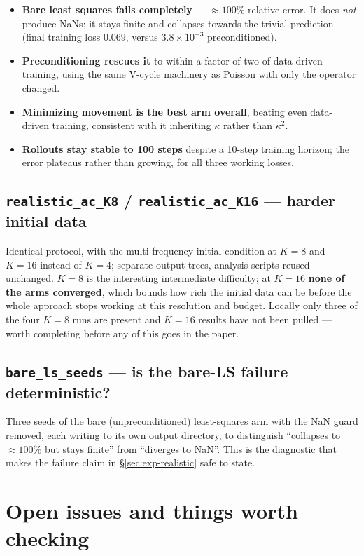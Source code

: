 \documentclass[11pt]{article}
\begin{document}
\begin{itemize}
   \item \textbf{Bare least squares fails completely} --- $\approx100\%$ relative error. It does
         \emph{not} produce NaNs; it stays finite and collapses towards the trivial prediction
         (final training loss $0.069$, versus $3.8\times10^{-3}$ preconditioned).
   \item \textbf{Preconditioning rescues it} to within a factor of two of data-driven training,
         using the same V-cycle machinery as Poisson with only the operator changed.
   \item \textbf{Minimizing movement is the best arm overall}, beating even data-driven training,
         consistent with it inheriting $\kappa$ rather than $\kappa^2$.
   \item \textbf{Rollouts stay stable to 100 steps} despite a 10-step training horizon; the error
         plateaus rather than growing, for all three working losses.
\end{itemize}

\subsection{\texttt{realistic\_ac\_K8} / \texttt{realistic\_ac\_K16} --- harder initial data}
Identical protocol, with the multi-frequency initial condition at $K=8$ and $K=16$ instead of
$K=4$; separate output trees, analysis scripts reused unchanged. $K=8$ is the interesting
intermediate difficulty; at $K=16$ \textbf{none of the arms converged}, which bounds how rich the
initial data can be before the whole approach stops working at this resolution and budget. Locally
only three of the four $K=8$ runs are present and $K=16$ results have not been pulled --- worth
completing before any of this goes in the paper.

\subsection{\texttt{bare\_ls\_seeds} --- is the bare-LS failure deterministic?}
Three seeds of the bare (unpreconditioned) least-squares arm with the NaN guard removed, each
writing to its own output directory, to distinguish ``collapses to $\approx100\%$ but stays
finite'' from ``diverges to NaN''. This is the diagnostic that makes the failure claim in
\S\ref{sec:exp-realistic} safe to state.

\section{Open issues and things worth checking}
\end{document}
